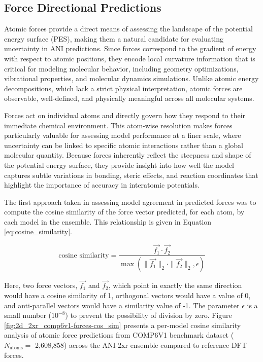 \subsection{Force Directional Predictions}
\label{subsec:forces}

Atomic forces provide a direct means of assessing the landscape of the potential energy surface (PES), making them a natural candidate for evaluating uncertainty in ANI predictions. 
Since forces correspond to the gradient of energy with respect to atomic positions, they encode local curvature information that is critical for modeling molecular behavior, including geometry optimizations, vibrational properties, and molecular dynamics simulations. 
Unlike atomic energy decompositions, which lack a strict physical interpretation, atomic forces are observable, well-defined, and physically meaningful across all molecular systems.

Forces act on individual atoms and directly govern how they respond to their immediate chemical environment. This atom-wise resolution makes forces particularly valuable for assessing model performance at a finer scale, where uncertainty can be linked to specific atomic interactions rather than a global molecular quantity. 
Because forces inherently reflect the steepness and shape of the potential energy surface, they provide insight into how well the model captures subtle variations in bonding, steric effects, and reaction coordinates that highlight the importance of accuracy in interatomic potentials.

The first approach taken in assessing model agreement in predicted forces was to compute the cosine similarity of the force vector predicted, for each atom, by each model in the ensemble. This relationship is given in Equation \ref{eq:cosine_similarity}.

\begin{equation}
\text{cosine similarity} = \frac{\vec{f_1} \cdot \vec{f_2}}{\max(\|\vec{f_1}\|_2 \cdot \|\vec{f_2}\|_2, \epsilon)}
\label{eq:cosine_similarity}
\end{equation}

Here, two force vectors, $\vec{f_1}$ and $\vec{f_2}$, which point in exactly the same direction would have a cosine similarity of 1, orthogonal vectors would have a value of 0, and anti-parallel vectors would have a similarity value of -1.
The parameter $\epsilon$ is a small number ($10^{-8}$) to prevent the possibility of division by zero. 
Figure \ref{fig:2d_2xr_comp6v1-forces-cos_sim} presents a per-model cosine similarity analysis of atomic force predictions from COMP6V1 benchmark dataset ($N_\text{atoms}=$ 2,608,858) across the ANI-2xr ensemble compared to reference DFT forces. 

